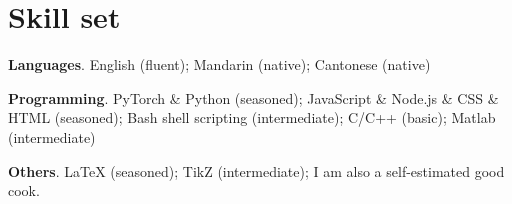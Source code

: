 \documentclass[letterpaper,11pt]{article}
\begin{document}
    \section{Skill set}

    \begin{resumeItemize}
        \item \textbf{Languages}. English (fluent); Mandarin (native); Cantonese (native)
        \item \textbf{Programming}. PyTorch \& Python (seasoned); JavaScript \& Node.js \& CSS \& HTML (seasoned); Bash shell scripting (intermediate); C/C++ (basic); Matlab (intermediate)
        \item \textbf{Others}. LaTeX (seasoned); TikZ (intermediate); I am also a self-estimated good cook.
    \end{resumeItemize}
\end{document}
